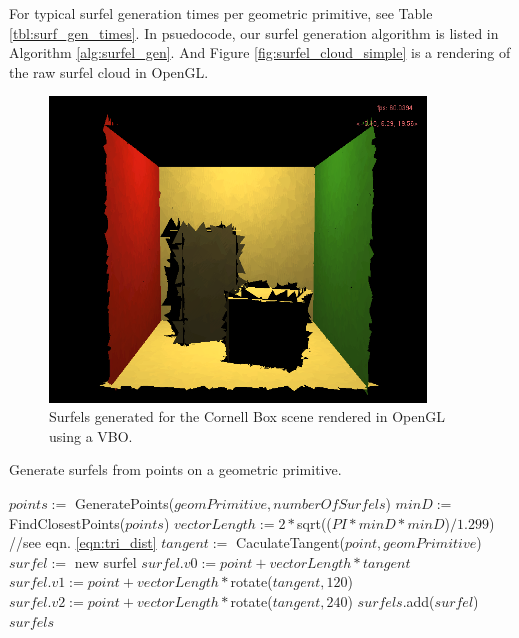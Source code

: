 For typical surfel generation times per geometric primitive, see Table \ref{tbl:surf_gen_times}. In psuedocode, our surfel generation algorithm is listed in Algorithm \ref{alg:surfel_gen}. And Figure \ref{fig:surfel_cloud_simple} is a rendering of the raw surfel cloud in OpenGL.

\begin{figure}
   \centering
   \includegraphics[width=100mm]{../img/surfel_cloud_simple.png}
   \captionfonts
   \caption[Cornell Box surfel cloud]{Surfels generated for the Cornell Box scene rendered in OpenGL using a VBO.}
   \label{fig:surfelcloud}
\end{figure}

\begin{algorithm}[H]
\captionfont
\caption[Surfel generation]{Generate surfels from points on a geometric primitive.}
\label{alg:surfel_gen}
{\fontsize{10}{9}\selectfont
\begin{algorithmic}
      \State $points :=$ GeneratePoints($geomPrimitive, numberOfSurfels$)
      \State $minD :=$ FindClosestPoints($points$)
      \State $vectorLength := 2 * $sqrt(($PI * minD * minD$)$ / 1.299$) //see eqn. \ref{eqn:tri_dist}
         \State $tangent :=$ CaculateTangent($point, geomPrimitive$)
         \State $surfel :=$ new surfel
         \State $surfel.v0 := point + vectorLength * tangent$
         \State $surfel.v1 := point + vectorLength * $rotate($tangent, 120$)
         \State $surfel.v2 := point + vectorLength * $rotate($tangent, 240$)
         \State $surfels$.add($surfel$)
      \EndFor
      \State \Return $surfels$
   \EndFunction
\end{algorithmic}
}
\end{algorithm}


